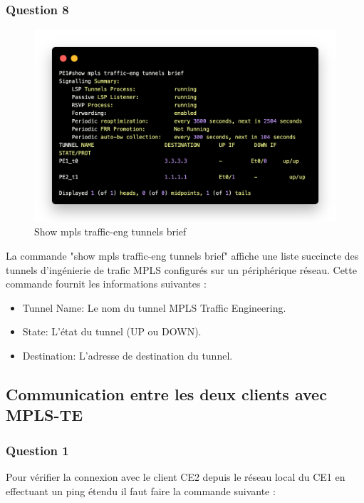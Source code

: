 \documentclass[12pt, a4paper]{article}
\begin{document}
\newpage
\subsubsection{Question 8}
\begin{figure}[h]
    \centering
    \includegraphics[width=1\textwidth]{img/code10.png}
    \caption{Show mpls traffic-eng tunnels brief}
    \label{fig:script10}
\end{figure}

La commande "show mpls traffic-eng tunnels brief" affiche une liste succincte 
des tunnels d'ingénierie de trafic MPLS configurés sur un périphérique réseau.
Cette commande fournit les informations suivantes :\\
\begin{itemize}
    \item Tunnel Name: Le nom du tunnel MPLS Traffic Engineering.
    \item State: L'état du tunnel (UP ou DOWN).
    \item Destination: L'adresse de destination du tunnel.
\end{itemize}

\newpage
\subsection{Communication entre les deux clients avec MPLS-TE}
\subsubsection{Question 1}
Pour vérifier la connexion avec le client CE2 depuis le réseau local
du CE1 en effectuant un ping étendu il faut faire la commande suivante :\\
\end{document}
